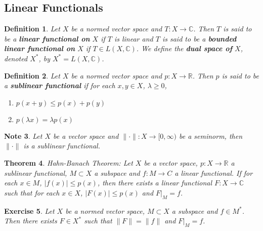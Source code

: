\documentclass[12pt]{amsart}
\newtheorem{thm}{Theorem}[subsection]
\newtheorem{defn}[thm]{Definition}
\newtheorem{note}[thm]{Note}
\newtheorem{ex}[thm]{Exercise}
\newcommand{\lam}{\lambda}
\newcommand{\C}{\mathbb{C}}
\newcommand{\R}{\mathbb{R}}
\newcommand{\Rg}{[0,\infty)}
\begin{document}
	\subsection{Linear Functionals}
	
	\begin{defn}
		Let $X$ be a normed vector space and $T :X \rightarrow \C$. Then $T$ is said to be a \textbf{linear functional on} $X$ if $T$ is linear and $T$ is said to be a \textbf{bounded linear functional on} $X$ if $T \in L(X, \C)$. We define the \textbf{dual space of} $X$, denoted $X^*$, by $X^* = L(X, \C)$.
	\end{defn}
	
	\begin{defn}
		Let $X$ be a normed vector space and $p:X \rightarrow \R$. Then $p$ is said to be a \textbf{sublinear functional} if for each $x,y \in X$, $\lam \geq 0$, 
		\begin{enumerate}
			\item $p(x+y) \leq p(x) + p(y)$
			\item $p(\lam x ) = \lam p(x)$
		\end{enumerate}  
	\end{defn}
	
	\begin{note}
		Let $X$ be a vector space and $\|\cdot \|: X \rightarrow \Rg$ be a seminorm, then $\|\cdot \|$ is a sublinear functional.
	\end{note}
	
	\begin{thm}{Hahn-Banach Theorem:}
		Let $X$ be a vector space, $p:X \rightarrow \R$ a sublinear functional, $M \subset X$ a subspace and $f:M \rightarrow C$ a linear functional. If for each $x \in M$, $\vert f(x) \vert \leq p(x)$, then there exists a linear functional $F:X \rightarrow \C$ such that for each $x \in X$, $\vert F(x) \vert \leq p(x)$ and $F|_{M}=f$.
	\end{thm}
	
	\begin{ex}
		Let $X$ be a normed vector space, $M \subset X$ a subspace and $f \in M^*$. Then there exists $F \in X^*$ such that $\|F \|= \|f \|$ and $F|_M = f$.  
	\end{ex}
	
\end{document}
